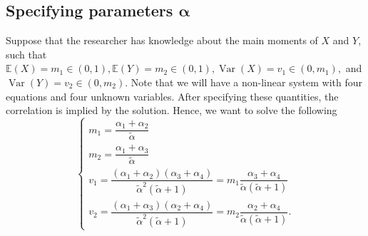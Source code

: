 \documentclass[a4paper, notitlepage, 11pt]{article}
\newcommand{\ev}{\mathbb{E}}
\newcommand{\var}{\operatorname{Var}}
\theoremstyle{definition}
\theoremstyle{remark}
\begin{document}
\subsection{Specifying parameters
\texorpdfstring{$\boldsymbol{\alpha}$}{alpha}}

Suppose that the researcher has knowledge about the main moments of $X$ and
$Y$, such that $\ev(X) = m_1 \in (0,1), \ev(Y) = m_2 \in (0,1), \var(X) = v_1
\in (0,m_1),$ and $\var(Y) =
v_2 \in (0,m_2)$. Note that we will have a non-linear system with four equations and four
unknown variables. After specifying these quantities, the correlation is
implied by the solution. Hence, we want to solve the following 
\begin{equation}
  \label{eq:system-moments-alpha}
  \begin{cases}
    m_1 = \dfrac{\alpha_1+\alpha_2}{\tilde{\alpha}} \\
    m_2 = \dfrac{\alpha_1+\alpha_3}{\tilde{\alpha}} \\ 
    v_1 = \dfrac{(\alpha_1+\alpha_2)(\alpha_3+\alpha_4)}{\tilde{\alpha}^2(\tilde{\alpha}+1)} = m_1\dfrac{\alpha_3+\alpha_4}{\tilde{\alpha}(\tilde{\alpha}+1)} \\
    v_2 = \dfrac{(\alpha_1+\alpha_3)(\alpha_2+\alpha_4)}{\tilde{\alpha}^2(\tilde{\alpha}+1)} = m_2\dfrac{\alpha_2+\alpha_4}{\tilde{\alpha}(\tilde{\alpha}+1)}.
  \end{cases}
\end{equation}
\end{document}
